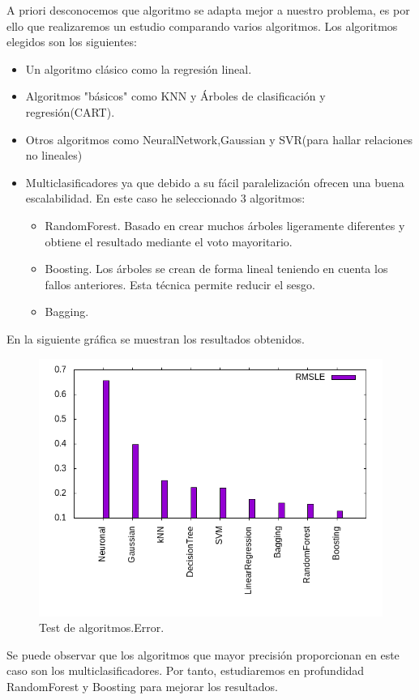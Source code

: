 A priori desconocemos que algoritmo se adapta mejor a nuestro problema, es por ello que realizaremos un estudio comparando varios algoritmos. Los algoritmos elegidos son los siguientes:
\begin{itemize}
	\item Un algoritmo clásico como la regresión lineal.
	\item Algoritmos "básicos" como KNN y Árboles de clasificación y regresión(CART).
	\item Otros algoritmos como NeuralNetwork,Gaussian y SVR(para hallar relaciones no lineales)
	\item Multiclasificadores ya que debido a su fácil paralelización ofrecen una buena escalabilidad. En este caso he seleccionado 3 algoritmos:
	\begin{itemize}
		\item RandomForest. Basado en crear muchos árboles ligeramente diferentes y obtiene el resultado mediante el voto mayoritario.
		\item Boosting. Los árboles se crean de forma lineal teniendo en cuenta los fallos anteriores. Esta técnica permite reducir el sesgo.
		\item Bagging.
	\end{itemize}
\end{itemize} En la siguiente gráfica se muestran los resultados obtenidos.
\begin{figure}[H]
	\includegraphics[scale=0.75]{./img/error.png}
	\caption{Test de algoritmos.Error.}
\end{figure}
Se puede observar que los algoritmos que mayor precisión proporcionan en este caso son los multiclasificadores. Por tanto, estudiaremos en profundidad RandomForest y Boosting para mejorar los resultados.
